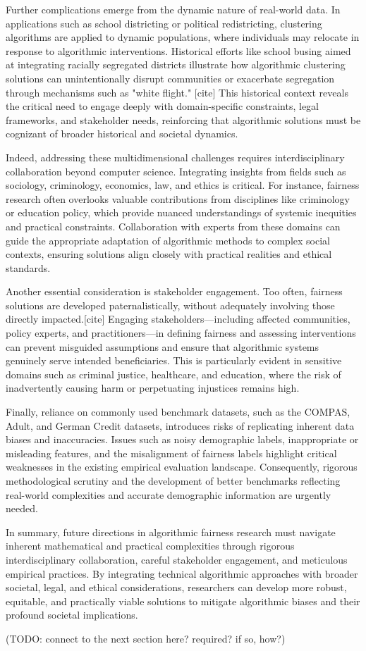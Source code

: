 Further complications emerge from the dynamic nature of real-world
data. In applications such as school districting or political
redistricting, clustering algorithms are applied to dynamic
populations, where individuals may relocate in response to
algorithmic interventions. Historical efforts like school busing
aimed at integrating racially segregated districts illustrate how
algorithmic clustering solutions can unintentionally disrupt
communities or exacerbate segregation through mechanisms such as
"white flight." [cite] This historical context reveals the critical need to
engage deeply with domain-specific constraints, legal frameworks, and
stakeholder needs, reinforcing that algorithmic solutions must be
cognizant of broader historical and societal dynamics.

Indeed, addressing these multidimensional challenges requires
interdisciplinary collaboration beyond computer science. Integrating
insights from fields such as sociology, criminology, economics, law,
and ethics is critical. For instance, fairness research often
overlooks valuable contributions from disciplines like criminology or
education policy, which provide nuanced understandings of systemic
inequities and practical constraints. Collaboration with experts from
these domains can guide the appropriate adaptation of algorithmic
methods to complex social contexts, ensuring solutions align closely
with practical realities and ethical standards.

Another essential consideration is stakeholder engagement. Too often,
fairness solutions are developed paternalistically, without
adequately involving those directly impacted.[cite] Engaging
stakeholders—including affected communities, policy experts, and
practitioners—in defining fairness and assessing interventions can
prevent misguided assumptions and ensure that algorithmic systems
genuinely serve intended beneficiaries. This is particularly evident
in sensitive domains such as criminal justice, healthcare, and
education, where the risk of inadvertently causing harm or
perpetuating injustices remains high.

Finally, reliance on commonly used benchmark datasets, such as the
COMPAS, Adult, and German Credit datasets, introduces risks of
replicating inherent data biases and inaccuracies. Issues such as
noisy demographic labels, inappropriate or misleading features, and
the misalignment of fairness labels highlight critical weaknesses in
the existing empirical evaluation landscape. Consequently, rigorous
methodological scrutiny and the development of better benchmarks
reflecting real-world complexities and accurate demographic
information are urgently needed.

In summary, future directions in algorithmic fairness research must
navigate inherent mathematical and practical complexities through
rigorous interdisciplinary collaboration, careful stakeholder
engagement, and meticulous empirical practices. By integrating
technical algorithmic approaches with broader societal, legal, and
ethical considerations, researchers can develop more robust,
equitable, and practically viable solutions to mitigate algorithmic
biases and their profound societal implications.

(TODO: connect to the next section here? required? if so, how?)